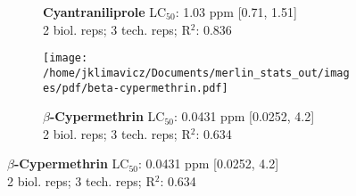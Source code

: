 \documentclass{article}
\begin{document}
\begin{figure}[thp!]
\begin{subfigure}{0.500\textwidth}
      \vspace{-0.05cm}
      \caption*{\textbf{Cyantraniliprole} LC$_{50}$: 1.03 ppm [0.71, 1.51] \\ 
2 biol. reps; 3 tech. reps; R$^2$: 0.836}
      \vspace{0.1cm}
   \end{subfigure}%
   \begin{subfigure}{0.500\textwidth}
      \centering
      \texttt{[image: /home/jklimavicz/Documents/merlin\_stats\_out/images/pdf/beta-cypermethrin.pdf]}
      \vspace{-0.05cm}
      \caption*{\textbf{$\beta$-Cypermethrin} LC$_{50}$: 0.0431 ppm [0.0252, 4.2] \\ 
2 biol. reps; 3 tech. reps; R$^2$: 0.634}
      \vspace{0.1cm}
   \end{subfigure}%
\end{figure}
\clearpage
\pagebreak
\vspace{-0.1cm}
\end{document}
